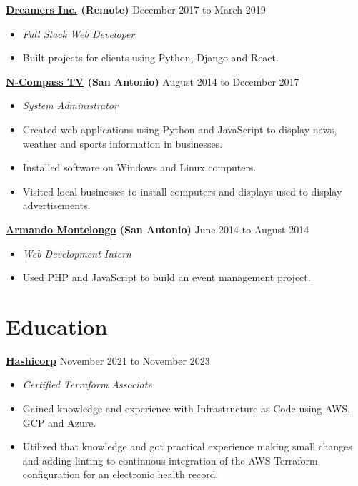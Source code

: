 \documentclass[10pt]{article}
\begin{document}
  \textbf{\href{https://thedreamers.us/}{Dreamers Inc.} (Remote)} \hfill {December 2017 to March 2019}
    \begin{itemize}
     \item[] \textit{Full Stack Web Developer}
     \item[] Built projects for clients using Python, Django and React.
    \end{itemize}

   \textbf{\href{https://n-compass.tv/}{N-Compass TV} (San Antonio)} \hfill {August 2014 to December 2017}
    \begin{itemize}
        \item[] \textit{System Administrator}
        \item[] Created web applications using Python and JavaScript to display news, weather and sports information in businesses.
        \item[] Installed software on Windows and Linux computers.
        \item[] Visited local businesses to install computers and displays used to display advertisements.
    \end{itemize}

   \textbf{\href{https://armandomontelongo.com/}{Armando Montelongo} (San Antonio)} \hfill {June 2014 to August 2014}
    \begin{itemize}
     \item[] \textit{Web Development Intern}
     \item[] Used PHP and JavaScript to build an event management project.
    \end{itemize}

   \section*{Education}
   \noindent

  \textbf{\href{https://www.credly.com/badges/d4012af6-1c9f-4ca8-aa2a-931c2c3c8e5b}{Hashicorp}} \hfill {November 2021 to November 2023}
   \begin{itemize}
     \item[] \textit{Certified Terraform Associate}
     \item[] Gained knowledge and experience with Infrastructure as Code using AWS, GCP and Azure.
     \item[] Utilized that knowledge and got practical experience making small changes and adding linting to continuous integration of the AWS Terraform configuration for an electronic health record.
    \end{itemize}
\end{document}
